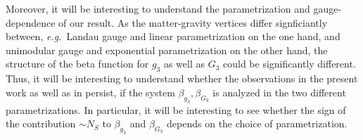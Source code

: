 \documentclass[11pt]{book} %
\newcommand\eg{\textit{e.g.}\ }
\numberwithin{equation}{chapter}
\begin{document}
Moreover, it will be interesting to understand the parametrization and gauge-dependence of our result.
As the matter-gravity vertices differ signficiantly between,
\eg Landau gauge and linear parametrization on the one hand,
and unimodular gauge and exponential parametrization on the other hand,
the structure of the beta function for $g_3$ as well as $G_3$ could be significantly different.
Thus, it will be interesting to understand whether the observations in the present work as
well as in \cite{Meibohm:2015twa} persist,
if the system $\beta_{g_3}, \beta_{G_3}$ is analyzed in the two different parametrizations.
In particular, it will be interesting to see whether the sign of the contribution
$\sim N_S$ to $\beta_{g_3}$ and $\beta_{G_3}$ depends on the choice of parametrization.




\nocite{*}





\end{document}
